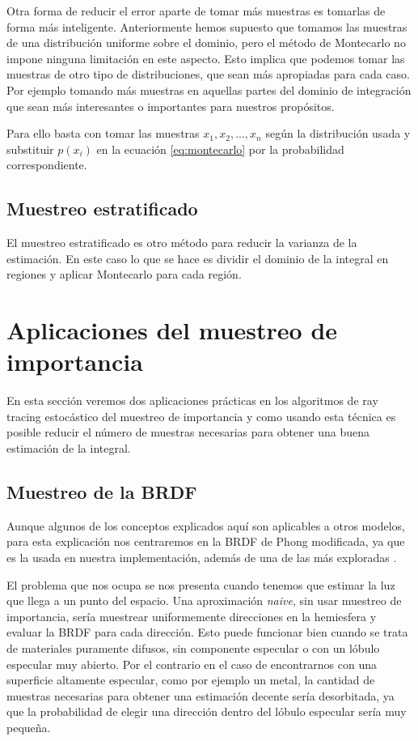 Otra forma de reducir el error aparte de tomar más muestras es tomarlas de forma más inteligente. Anteriormente hemos supuesto que tomamos las muestras de una distribución uniforme sobre el dominio, pero el método de Montecarlo no impone ninguna limitación en este aspecto. Esto implica que podemos tomar las muestras de otro tipo de distribuciones, que sean más apropiadas para cada caso. Por ejemplo tomando más muestras en aquellas partes del dominio de integración que sean más interesantes o importantes para nuestros propósitos.

\medskip

Para ello basta con tomar las muestras $x_1, x_2, ..., x_n$ según la distribución usada y substituir $p(x_i)$ en la ecuación \ref{eq:montecarlo} por la probabilidad correspondiente.

\subsection{Muestreo estratificado}

El muestreo estratificado es otro método para reducir la varianza de la estimación. En este caso lo que se hace es dividir el dominio de la integral en regiones y aplicar Montecarlo para cada región. 

\clearpage

\section{Aplicaciones del muestreo de importancia}

En esta sección veremos dos aplicaciones prácticas en los algoritmos de ray tracing estocástico del muestreo de importancia y como usando esta técnica es posible reducir el número de muestras necesarias para obtener una buena estimación de la integral.


\subsection{Muestreo de la BRDF}
\label{muestreo_brdf}
Aunque algunos de los conceptos explicados aquí son aplicables a otros modelos, para esta explicación nos centraremos en la BRDF de Phong modificada, ya que es la usada en nuestra implementación, además de una de las más exploradas \cite{Lafortune1994}.



\medskip

El problema que nos ocupa se nos presenta cuando tenemos que estimar la luz que llega a un punto del espacio. Una aproximación \emph{naive}, sin usar muestreo de importancia, sería muestrear uniformemente direcciones en la hemiesfera y evaluar la BRDF para cada dirección. Esto puede funcionar bien cuando se trata de materiales puramente difusos, sin componente especular o con un lóbulo especular muy abierto. Por el contrario en el caso de encontrarnos con una superficie altamente especular, como por ejemplo un metal, la cantidad de muestras necesarias para obtener una estimación decente sería desorbitada, ya que la probabilidad de elegir una dirección dentro del lóbulo especular sería muy pequeña.

